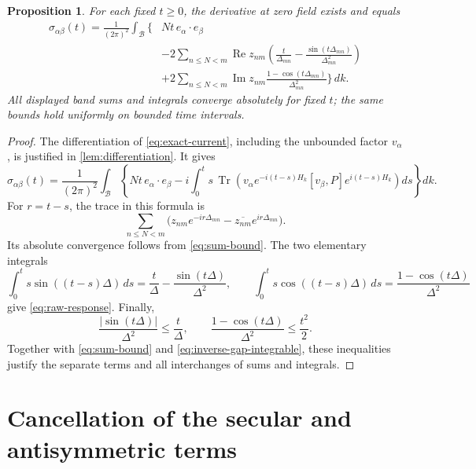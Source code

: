\documentclass[11pt,a4paper]{article}
\newcommand{\B}{\mathcal B}
\newcommand{\cB}{\frac{1}{(2\pi)^2}}
\DeclareMathOperator{\Tr}{Tr}
\DeclareMathOperator{\Ree}{Re}
\DeclareMathOperator{\Imm}{Im}
\newtheorem{proposition}[proposition]{Proposition}
\numberwithin{equation}{section}
\begin{document}
\begin{proposition}\label{prop:raw-response}
For each fixed $t\geq0$, the derivative at zero field exists and equals
\begin{equation}\label{eq:raw-response}
 \begin{split}
 \sigma_{\alpha\beta}(t)=\cB\int_\B\Bigg\{&
 Nt\,e_\alpha\cdot e_\beta\\
 &-2\sum_{n\leq N<m}\Ree z_{nm}
 \left(\frac{t}{\Delta_{mn}}
       -\frac{\sin(t\Delta_{mn})}{\Delta_{mn}^2}\right)\\
 &+2\sum_{n\leq N<m}\Imm z_{nm}
 \frac{1-\cos(t\Delta_{mn})}{\Delta_{mn}^2}
 \Bigg\}\,dk.
 \end{split}
\end{equation}
All displayed band sums and integrals converge absolutely for fixed
$t$; the same bounds hold uniformly on bounded time intervals.
\end{proposition}

\begin{proof}
The differentiation of \eqref{eq:exact-current}, including the
unbounded factor $v_\alpha$, is justified in \cref{lem:differentiation}.
It gives
\begin{equation}\label{eq:commutator-response}
 \sigma_{\alpha\beta}(t)=\cB\int_\B
 \left\{Nt\,e_\alpha\cdot e_\beta
 -i\int_0^t s\,
 \Tr\!\left(
 v_\alpha e^{-i(t-s)H_k}[v_\beta,P]e^{i(t-s)H_k}
 \right)ds\right\}dk.
\end{equation}
For $r=t-s$, the trace in this formula is
\begin{equation}\label{eq:commutator-bands}
 \sum_{n\leq N<m}
 \bigl(z_{nm}e^{-ir\Delta_{mn}}
       -\overline{z_{nm}}e^{ir\Delta_{mn}}\bigr).
\end{equation}
Its absolute convergence follows from \eqref{eq:sum-bound}. The two
elementary integrals
\[
 \int_0^t s\sin((t-s)\Delta)\,ds
 =\frac{t}{\Delta}-\frac{\sin(t\Delta)}{\Delta^2},\qquad
 \int_0^t s\cos((t-s)\Delta)\,ds
 =\frac{1-\cos(t\Delta)}{\Delta^2}
\]
give \eqref{eq:raw-response}. Finally,
\[
 \frac{|\sin(t\Delta)|}{\Delta^2}\leq\frac{t}{\Delta},
 \qquad
 \frac{1-\cos(t\Delta)}{\Delta^2}\leq\frac{t^2}{2}.
\]
Together with \eqref{eq:sum-bound} and
\eqref{eq:inverse-gap-integrable}, these inequalities justify the
separate terms and all interchanges of sums and integrals.
\end{proof}

\section{Cancellation of the secular and antisymmetric terms}
\label{sec:cancellation}
\end{document}
